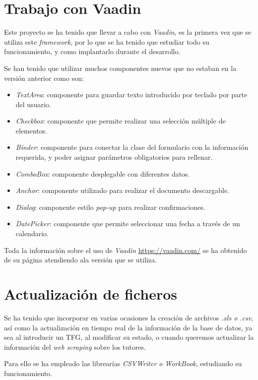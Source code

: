 \section{Trabajo con Vaadin}

Este proyecto se ha tenido que llevar a cabo con \emph{Vaadin}, es la primera vez que se utiliza este \emph{framework}, por lo que se ha tenido que estudiar todo su funcionamiento, y como implantarlo durante el desarrollo.

Se han tenido que utilizar muchos componentes nuevos que no estaban en la versión anterior como son:

\begin{itemize}
	\item \emph{TextArea}: componente para guardar texto introducido por teclado por parte del usuario.
	\item \emph{Checkbox}: componente que permite realizar una selección múltiple de elementos.
	\item \emph{Binder}: componente para conectar la clase del formulario con la información requerida, y poder asignar parámetros obligatorios para rellenar.
	\item \emph{ComboBox}: componente desplegable con diferentes datos.
	\item \emph{Anchor}: componente utilizado para realizar el documento descargable.
	\item \emph{Dialog}: componente estilo \emph{pop-up} para realizar confirmaciones.
	\item \emph{DatePicker}: componente que permite seleccionar una fecha a través de un calendario.

\end{itemize}

Toda la información sobre el uso de \emph{Vaadin} \url{https://vaadin.com/} se ha obtenido de su página atendiendo ala versión que se utiliza.

\section{Actualización de ficheros}

Se ha tenido que incorporar en varias ocasiones la creación de archivos \emph{.xls o .csv}, así como la actualización en tiempo real de la información de la base de datos, ya sea al introducir un TFG, al modificar su estado, o cuando queremos actualizar la información del \emph{web scraping} sobre los tutores.

Para ello se ha empleado las librearías \emph{CSVWriter o WorkBook}, estudiando su funcionamiento.

